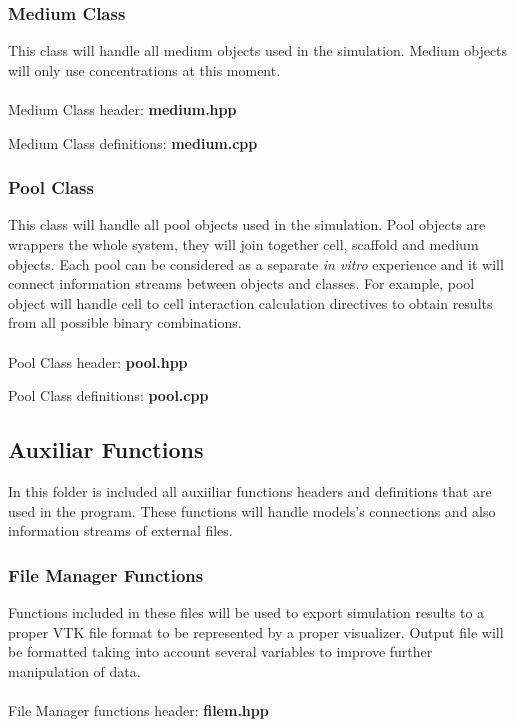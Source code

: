 \newpage
\subsubsection{Medium Class}
This class will handle all medium objects used in the simulation. Medium objects will only use concentrations at this moment.\\
\\
Medium Class header: \textbf{medium.hpp}
 

Medium Class definitions: \textbf{medium.cpp}
 		


\newpage
\subsubsection{Pool Class}
This class will handle all pool objects used in the simulation. Pool objects are wrappers the whole system, they will join together cell, scaffold and medium objects. Each pool can be considered as a separate \textit{in vitro} experience and it will connect information streams between objects and classes. For example, pool object will handle cell to cell interaction calculation directives to obtain results from all possible binary combinations.\\
\\
Pool Class header: \textbf{pool.hpp}
 

Pool Class definitions: \textbf{pool.cpp}
 		


\newpage
\subsection{Auxiliar Functions}
In this folder is included all auxiiliar functions headers and definitions that are used in the program. These functions will handle models's connections and also information streams of external files. 

\subsubsection{File Manager Functions}
Functions included in these files will be used to export simulation results to a proper VTK file format to be represented by a proper visualizer. Output file will be formatted taking into account several variables to improve further manipulation of data.\\
\\ 
File Manager functions header: \textbf{filem.hpp}
 

